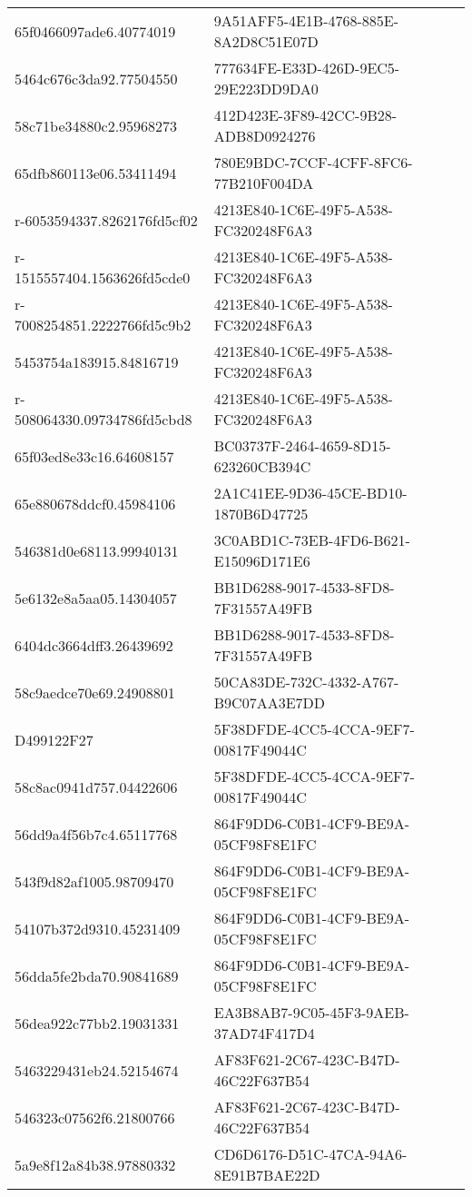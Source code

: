 \begin{tabular}{ll}
65f0466097ade6.40774019 & 9A51AFF5-4E1B-4768-885E-8A2D8C51E07D \\
5464c676c3da92.77504550 & 777634FE-E33D-426D-9EC5-29E223DD9DA0 \\
58c71be34880c2.95968273 & 412D423E-3F89-42CC-9B28-ADB8D0924276 \\
65dfb860113e06.53411494 & 780E9BDC-7CCF-4CFF-8FC6-77B210F004DA \\
r-6053594337.8262176fd5cf02 & 4213E840-1C6E-49F5-A538-FC320248F6A3 \\
r-1515557404.1563626fd5cde0 & 4213E840-1C6E-49F5-A538-FC320248F6A3 \\
r-7008254851.2222766fd5c9b2 & 4213E840-1C6E-49F5-A538-FC320248F6A3 \\
5453754a183915.84816719 & 4213E840-1C6E-49F5-A538-FC320248F6A3 \\
r-508064330.09734786fd5cbd8 & 4213E840-1C6E-49F5-A538-FC320248F6A3 \\
65f03ed8e33c16.64608157 & BC03737F-2464-4659-8D15-623260CB394C \\
65e880678ddcf0.45984106 & 2A1C41EE-9D36-45CE-BD10-1870B6D47725 \\
546381d0e68113.99940131 & 3C0ABD1C-73EB-4FD6-B621-E15096D171E6 \\
5e6132e8a5aa05.14304057 & BB1D6288-9017-4533-8FD8-7F31557A49FB \\
6404dc3664dff3.26439692 & BB1D6288-9017-4533-8FD8-7F31557A49FB \\
58c9aedce70e69.24908801 & 50CA83DE-732C-4332-A767-B9C07AA3E7DD \\
D499122F27 & 5F38DFDE-4CC5-4CCA-9EF7-00817F49044C \\
58c8ac0941d757.04422606 & 5F38DFDE-4CC5-4CCA-9EF7-00817F49044C \\
56dd9a4f56b7c4.65117768 & 864F9DD6-C0B1-4CF9-BE9A-05CF98F8E1FC \\
543f9d82af1005.98709470 & 864F9DD6-C0B1-4CF9-BE9A-05CF98F8E1FC \\
54107b372d9310.45231409 & 864F9DD6-C0B1-4CF9-BE9A-05CF98F8E1FC \\
56dda5fe2bda70.90841689 & 864F9DD6-C0B1-4CF9-BE9A-05CF98F8E1FC \\
56dea922c77bb2.19031331 & EA3B8AB7-9C05-45F3-9AEB-37AD74F417D4 \\
5463229431eb24.52154674 & AF83F621-2C67-423C-B47D-46C22F637B54 \\
546323c07562f6.21800766 & AF83F621-2C67-423C-B47D-46C22F637B54 \\
5a9e8f12a84b38.97880332 & CD6D6176-D51C-47CA-94A6-8E91B7BAE22D \\

\end{tabular}
